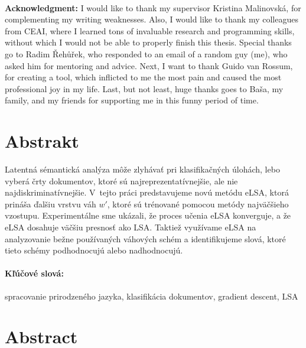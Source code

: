 \documentclass[12pt, oneside]{book}
\theoremstyle{definition}
\begin{document}
\newpage 
\thispagestyle{empty}



\frontmatter

\setcounter{page}{3}
\newpage 
~

\vfill
{\bf Acknowledgment:} 
I would like to thank my supervisor Kristina Malinovská, for complementing my writing weaknesses. 
Also, I would like to thank my colleagues from CEAI, where I learned tons of invaluable research and programming skills, without which I would not be able to properly finish this thesis.
Special thanks go to Radim Řehůřek, who responded to an email of a random guy (me), who asked him for mentoring and advice.
Next, I want to thank Guido van Rossum, for creating a tool, which inflicted to me the most pain and caused the most professional joy in my life. 
Last, but not least, huge thanks goes to Baša, my family, and my friends for supporting me in this funny period of time. 




\newpage 
\section*{Abstrakt}

Latentná sémantická analýza môže zlyhávať pri klasifikačných úlohách, lebo vyberá črty dokumentov, ktoré sú najreprezentatívnejšie, ale nie najdiskriminatívnejšie. 
V~tejto práci predstavujeme novú metódu eLSA, ktorá prináša ďalšiu vrstvu váh $w'$, ktoré sú trénované pomocou metódy najväčšieho vzostupu.
Experimentálne sme ukázali, že proces učenia eLSA konverguje, a že eLSA dosahuje väčšiu presnosť ako LSA.
Taktiež využívame eLSA na analyzovanie bežne používaných váhových schém a identifikujeme slová, ktoré tieto schémy podhodnocujú alebo nadhodnocujú.

\paragraph*{Kľúčové slová:} spracovanie prirodzeného jazyka, klasifikácia dokumentov, gradient descent, LSA


\newpage 
\section*{Abstract}
\end{document}
